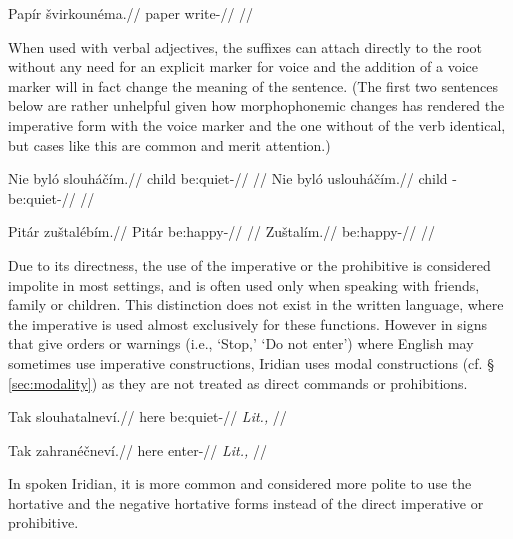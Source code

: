 \pex
\begingl
    \gla Papír švirkounéma.//
    \glb paper write-//
    \glft {}//
\endgl
\xe

When used with verbal adjectives, the suffixes can attach directly to the root without any need for an explicit marker for voice and the addition of a voice marker will in fact change the meaning of the sentence. (The first two sentences below are rather unhelpful given how morphophonemic changes has rendered the imperative form with the voice marker and the one without of the verb  identical, but cases like this are common and merit attention.)

\pex
\a
\begingl
    \gla Nie byló slouháčím.//
    \glb {} child be:quiet-//
    \glft {}//
\endgl
\a
\begingl
    \gla Nie byló uslouháčím.//
    \glb {} child -be:quiet-//
    \glft {}//
\endgl
\xe

\pex
\a
\begingl
    \gla Pitár zuštalébím.//
    \glb Pitár be:happy-//
    \glft {}//
\endgl
\a
\begingl
    \gla Zuštalím.//
    \glb be:happy-//
    \glft {}//
\endgl
\xe


Due to its directness, the use of the imperative or the prohibitive is
considered impolite in most settings, and is often used only when speaking with
friends, family or children. This distinction does not exist in the written
language, where the imperative is used almost exclusively for these functions.
However in signs that give orders or warnings (i.e., `Stop,' `Do not enter')
where English may sometimes use imperative constructions, Iridian uses modal
constructions (cf. \S\,\ref{sec:modality}) as they are not treated
 as direct commands or prohibitions.

\pex
\begingl
    \gla Tak slouhatalneví.//
    \glb here be:quiet-//
    \glft {} \textit{Lit.,} //
\endgl
\xe

\pex
\begingl
    \gla Tak zahranéčneví.//
    \glb here enter-//
    \glft {} \textit{Lit.,} //
\endgl
\xe

In spoken Iridian, it is more common and considered more polite to use the
hortative and the negative hortative forms instead of the direct imperative
or prohibitive.

